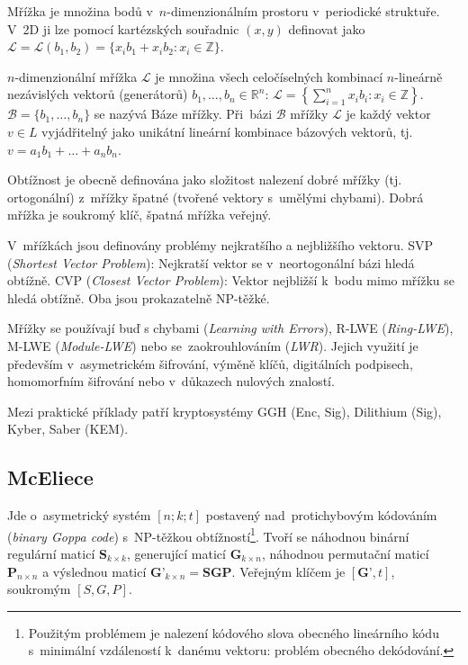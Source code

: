 Mřížka je množina bodů v~$n$-dimenzionálním prostoru v~periodické struktuře.
V~2D ji lze pomocí kartézských souřadnic $(x, y)$ definovat jako
$\mathcal{L} = \mathcal{L}(b_1, b_2) = \{x_i b_1 + x_i b_2 : x_i \in \mathbb{Z}\}$.

$n$-dimenzionální mřížka $\mathcal{L}$ je množina všech celočíselných kombinací $n$-lineárně nezávislých vektorů (generátorů) $b_1, \dots, b_n \in \mathbb{R}^n$:
$\mathcal{L} = \left\{ \sum_{i=1}^n x_i b_i : x_i \in \mathbb{Z} \right\}$.
$\mathcal{B} = \{b_1, \dots, b_n\}$ se nazývá Báze mřížky.
Při~bázi $\mathcal{B}$ mřížky $\mathcal{L}$ je každý vektor $v \in L$ vyjádřitelný jako unikátní lineární kombinace bázových vektorů, tj. $v = a_1 b_1 + \dots + a_n b_n$.

Obtížnost je obecně definována jako složitost nalezení dobré mřížky (tj. ortogonální) z~mřížky špatné (tvořené vektory s~umělými chybami).
Dobrá mřížka je soukromý klíč, špatná mřížka veřejný.

V~mřížkách jsou definovány problémy nejkratšího a nejbližšího vektoru.
SVP (\emph{Shortest Vector Problem}): Nejkratší vektor se v~neortogonální bázi hledá obtížně.
CVP (\emph{Closest Vector Problem}): Vektor nejbližší k~bodu mimo mřížku se hledá obtížně.
Oba jsou prokazatelně NP-těžké.

Mřížky se používají buď s chybami (\emph{Learning with Errors}), R-LWE (\emph{Ring-LWE}), M-LWE (\emph{Module-LWE}) nebo se~zaokrouhlováním (\emph{LWR}).
Jejich využití je především v~asymetrickém šifrování, výměně klíčů, digitálních podpisech, homomorfním šifrování nebo v~důkazech nulových znalostí.

Mezi praktické příklady patří kryptosystémy GGH (Enc, Sig), Dilithium (Sig), Kyber, Saber (KEM).


\subsection{McEliece}

Jde o~asymetrický systém $[n;k;t]$ postavený nad~protichybovým kódováním (\emph{binary Goppa code}) s~NP-těžkou obtížností\footnote{Použitým problémem je nalezení kódového slova obecného lineárního kódu s~minimální vzdáleností k~danému vektoru: problém obecného dekódování.}.
Tvoří se náhodnou binární regulární maticí $\textbf{S}_{k \times k}$, generující maticí $\textbf{G}_{k \times n}$, náhodnou permutační maticí $\textbf{P}_{n \times n}$ a výslednou maticí $\textbf{G'}_{k \times n} = \textbf{SGP}$.
Veřejným klíčem je $[\textbf{G'}, t]$, soukromým $[S, G, P]$.


